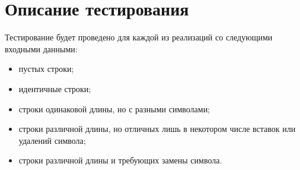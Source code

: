 \section{Описание тестирования}

Тестирование будет проведено для каждой из реализаций со следующими входными данными:
\begin{itemize}
	\item пустых строки;
	\item идентичные строки;
	\item строки одинаковой длины, но с разными символами;
	\item строки различной длины, но отличных лишь в некотором числе вставок или удалений символа;
	\item строки различной длины и требующих замены символа.
\end{itemize}
